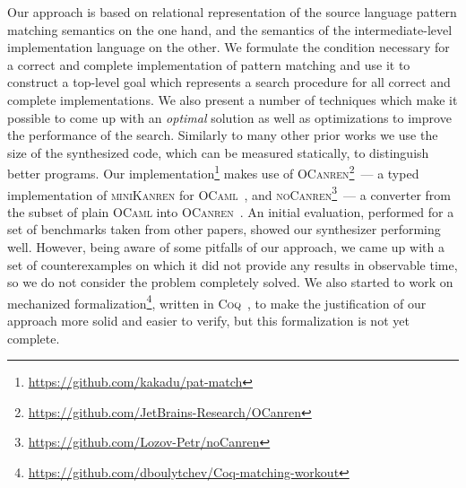 Our approach is based on relational representation of the source language pattern matching semantics on the one hand, and
the semantics of the intermediate-level implementation language on the other. We formulate the condition necessary for a correct and complete implementation of pattern matching and use it to
construct a top-level goal which represents a search procedure for all correct and complete implementations. We also present a number of techniques which make it possible to come up with an
\emph{optimal} solution as well as optimizations to improve the performance of the search. Similarly to many other prior works we use the size of the synthesized code, which can be measured
statically, to distinguish better programs. Our implementation\footnote{\url{https://github.com/kakadu/pat-match}} makes use of \textsc{OCanren}\footnote{\url{https://github.com/JetBrains-Research/OCanren}}~--- a typed implementation of \textsc{miniKanren} for \textsc{OCaml}~\cite{OCanren}, and \textsc{noCanren}\footnote{\url{https://github.com/Lozov-Petr/noCanren}}~--- a converter from the subset
of plain \textsc{OCaml} into \textsc{OCanren}~\cite{conversion}. An initial  evaluation, performed for a set of benchmarks taken from other papers, showed our synthesizer performing well.
However, being aware of some pitfalls of our approach, we came up with a set of counterexamples on which it did not provide any results in observable time, so we do not consider the problem
completely solved. We also started to work on mechanized formalization\footnote{\url{https://github.com/dboulytchev/Coq-matching-workout}}, written in \textsc{Coq}~\cite{Coq}, to
make the justification of our approach more solid and easier to verify, but this formalization is not yet complete. 

 

\begin{comment}
We apply relational programming techniques to the problem of synthesizing efficient implementation for a pattern matching construct.
Although in principle pattern matching can be implemented in a trivial way, the result suffers from inefficiency in terms of both
performance and code size. Thus, in implementing functional languages alternative, more elaborate  approaches are widely used.
However, as there are multiple kinds and flavors of pattern matching constructs, these approaches have to be specifically developed
and justified for each concrete inhabitant of the pattern matching ``zoo''. We formulate the pattern matching synthesis problem in
declarative terms and apply relational programming, a specific form of constraint logic programming, to develop a 
develop optimizations which improve the efficiency of the synthesis and guarantee the
optimality of the result. 
\end{comment}
